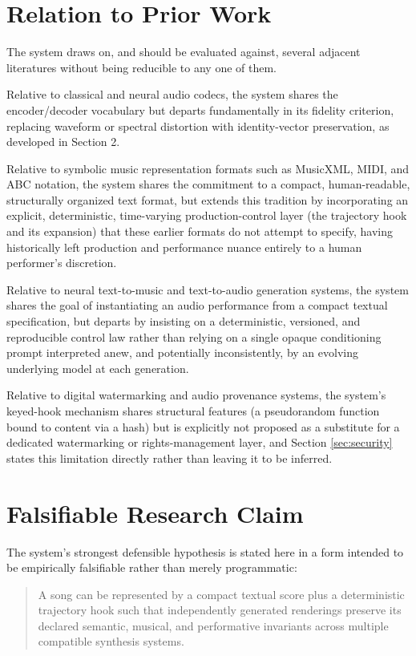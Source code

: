 \documentclass[11pt]{article}
\begin{document}
\section{Relation to Prior Work}

The system draws on, and should be evaluated against, several adjacent literatures without being reducible to any one of them.

Relative to classical and neural audio codecs, the system shares the encoder/decoder vocabulary but departs fundamentally in its fidelity criterion, replacing waveform or spectral distortion with identity-vector preservation, as developed in Section 2.

Relative to symbolic music representation formats such as MusicXML, MIDI, and ABC notation, the system shares the commitment to a compact, human-readable, structurally organized text format, but extends this tradition by incorporating an explicit, deterministic, time-varying production-control layer (the trajectory hook and its expansion) that these earlier formats do not attempt to specify, having historically left production and performance nuance entirely to a human performer's discretion.

Relative to neural text-to-music and text-to-audio generation systems, the system shares the goal of instantiating an audio performance from a compact textual specification, but departs by insisting on a deterministic, versioned, and reproducible control law rather than relying on a single opaque conditioning prompt interpreted anew, and potentially inconsistently, by an evolving underlying model at each generation.

Relative to digital watermarking and audio provenance systems, the system's keyed-hook mechanism shares structural features (a pseudorandom function bound to content via a hash) but is explicitly not proposed as a substitute for a dedicated watermarking or rights-management layer, and Section \ref{sec:security} states this limitation directly rather than leaving it to be inferred.

\section{Falsifiable Research Claim}

The system's strongest defensible hypothesis is stated here in a form intended to be empirically falsifiable rather than merely programmatic:

\begin{quote}
A song can be represented by a compact textual score plus a deterministic trajectory hook such that independently generated renderings preserve its declared semantic, musical, and performative invariants across multiple compatible synthesis systems.
\end{quote}
\end{document}
